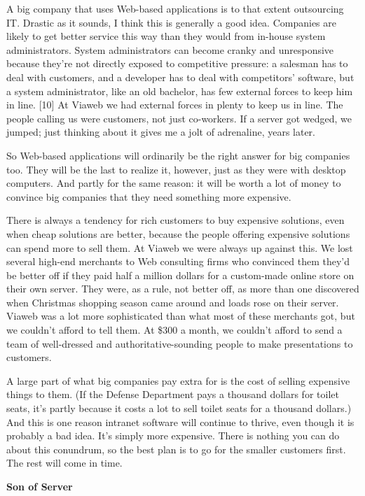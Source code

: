 A big company that uses Web-based applications is to that extent
outsourcing IT. Drastic as it sounds, I think this is generally a good
idea. Companies are likely to get better service this way than they
would from in-house system administrators. System administrators can
become cranky and unresponsive because they're not directly exposed to
competitive pressure: a salesman has to deal with customers, and a
developer has to deal with competitors' software, but a system
administrator, like an old bachelor, has few external forces to keep him
in line. {[}10{]} At Viaweb we had external forces in plenty to keep us
in line. The people calling us were customers, not just co-workers. If a
server got wedged, we jumped; just thinking about it gives me a jolt of
adrenaline, years later.

So Web-based applications will ordinarily be the right answer for big
companies too. They will be the last to realize it, however, just as
they were with desktop computers. And partly for the same reason: it
will be worth a lot of money to convince big companies that they need
something more expensive.

There is always a tendency for rich customers to buy expensive
solutions, even when cheap solutions are better, because the people
offering expensive solutions can spend more to sell them. At Viaweb we
were always up against this. We lost several high-end merchants to Web
consulting firms who convinced them they'd be better off if they paid
half a million dollars for a custom-made online store on their own
server. They were, as a rule, not better off, as more than one
discovered when Christmas shopping season came around and loads rose on
their server. Viaweb was a lot more sophisticated than what most of
these merchants got, but we couldn't afford to tell them. At \$300 a
month, we couldn't afford to send a team of well-dressed and
authoritative-sounding people to make presentations to customers.

A large part of what big companies pay extra for is the cost of selling
expensive things to them. (If the Defense Department pays a thousand
dollars for toilet seats, it's partly because it costs a lot to sell
toilet seats for a thousand dollars.) And this is one reason intranet
software will continue to thrive, even though it is probably a bad idea.
It's simply more expensive. There is nothing you can do about this
conundrum, so the best plan is to go for the smaller customers first.
The rest will come in time.

\textbf{Son of Server}

